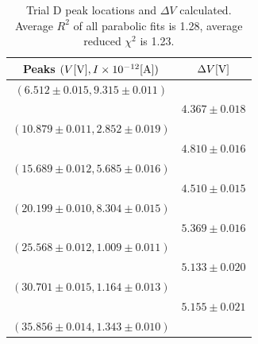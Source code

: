 \documentclass[12pt]{article}
\begin{document}
\begin{table}[h!]
    \centering
        \caption{\centering Trial D peak locations and \(\Delta V\) calculated. Average $R^2$ of all parabolic fits is 1.28, average reduced $\chi^2$ is 1.23.}
    \begin{tabular}{cc}
        \toprule
        Peaks $(V [{\rm V}], I \times10^{-12}[{\rm A}])$ & $\Delta V{\rm [V]}$ \\
        \midrule
    $(6.512 \pm 0.015, 9.315 \pm 0.011)$ & \\
    & $4.367 \pm 0.018$ \\ 
    $(10.879 \pm 0.011, 2.852 \pm 0.019)$ & \\
    & $4.810 \pm 0.016$ \\ 
    $(15.689 \pm 0.012, 5.685 \pm 0.016)$ & \\
    & $4.510 \pm 0.015$ \\ 
    $(20.199 \pm 0.010, 8.304 \pm 0.015)$ & \\
    & $5.369 \pm 0.016$ \\ 
    $(25.568 \pm 0.012, 1.009 \pm 0.011)$ & \\
    & $5.133 \pm 0.020$ \\ 
    $(30.701 \pm 0.015, 1.164 \pm 0.013)$ & \\
    & $5.155 \pm 0.021$ \\ 
    $(35.856 \pm 0.014, 1.343 \pm 0.010)$ & \\
        \bottomrule
    \end{tabular}
    \label{table:D_peaks}
\end{table}
\end{document}
